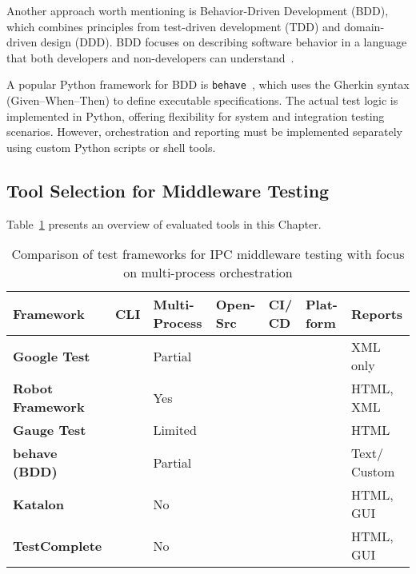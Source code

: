 Another approach worth mentioning is Behavior-Driven Development (BDD), which combines principles from test-driven development (TDD) and domain-driven design (DDD). BDD focuses on describing software behavior in a language that both developers and non-developers can understand~\cite{North2006}.

\vspace{1em}
A popular Python framework for BDD is \texttt{behave}~\cite{BehaveDocs}, which uses the Gherkin syntax (Given–When–Then) to define executable specifications. The actual test logic is implemented in Python, offering flexibility for system and integration testing scenarios. However, orchestration and reporting must be implemented separately using custom Python scripts or shell tools.

\newpage
\subsection{Tool Selection for Middleware Testing}

\vspace{0em}
Table~\ref{tab:framework_comparison_reporting} presents an overview of evaluated tools in this Chapter.

\begin{table}[H]
	\centering
	\renewcommand{\arraystretch}{1.4}
	\begin{tabular}{|p{2.8cm}|p{1cm}|p{1.8cm}|p{1.2cm}|p{1cm}|p{1cm}|p{1.8cm}|}
		\hline
		\textbf{Framework} & \textbf{CLI} & \textbf{Multi- Process} & \textbf{Open- Src} & \textbf{CI/ CD} & \textbf{Plat- form} & \textbf{Reports} \\
		\hline
		\textbf{Google Test}         & \cmark & Partial & \cmark & \cmark & \cmark & XML only \\
		\hline
		\textbf{Robot Framework}     & \cmark & Yes     & \cmark & \cmark & \cmark & HTML, XML \\
		\hline
		\textbf{Gauge Test}          & \cmark & Limited & \cmark & \cmark & \cmark & HTML \\
		\hline
		\textbf{behave (BDD)}        & \cmark & Partial & \cmark & \cmark & \cmark & Text/ Custom \\
		\hline
		\textbf{Katalon}             & \xmark & No      & \xmark & \xmark & \cmark    & HTML, GUI \\
		\hline
		\textbf{TestComplete}        & \xmark & No      & \xmark & \xmark & \cmark   & HTML, GUI \\
		\hline
	\end{tabular}
	\caption{Comparison of test frameworks for IPC middleware testing with focus on multi-process orchestration}
	\label{tab:framework_comparison_reporting}
\end{table}


